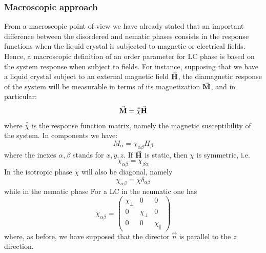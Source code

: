 \documentclass[../../Main/Main.tex]{subfiles}
\begin{document}
\subsubsection{Macroscopic approach}
From a macroscopic point of view we have already stated that an important difference between the disordered and nematic phases consists in the response functions when the liquid crystal is subjected to magnetic or electrical fields. Hence, a macroscopic definition of an order parameter for LC phase is based on the system response when subject to fields. For instance, supposing that we have a liquid crystal subject to an external magnetic field \( \va{H} \), the diamagnetic response of the system will be measurable in terms of its magnetization \( \va{M} \), and in particular:
\begin{equation}
  \va{M} = \bar{\bar{\chi } } \va{H}
\end{equation}
where  \(  \bar{\bar{\chi } } \) is the response function matrix, namely the magnetic susceptibility of the system. In components we have:
\begin{equation}
  M_ \alpha = \chi _{\alpha \beta } H _{\beta }
\end{equation}
where the inexes \( \alpha , \beta  \) stands for \( x,y,z \). If \( \va{H} \) is static, then \( \chi  \) is symmetric, i.e.
\begin{equation*}
  \chi _{\alpha \beta } = \chi _{\beta \alpha }
\end{equation*}
In the isotropic phase \( \chi  \) will also be diagonal, namely
\begin{equation*}
  \chi _{\alpha \beta } = \chi  \delta _{\alpha \beta }
\end{equation*}
while in the nematic phase
For a LC in the neumatic one has
\begin{equation}
  \chi _{\alpha \beta } =
  \begin{pmatrix}
  \chi _\bot   &  0 & 0 \\
    0 &  \chi _ \bot & 0 \\
    0 &  0 &  \chi _\parallel
  \end{pmatrix}
\end{equation}
where, as before, we have supposed that the director \( \overset{\leftrightarrow}{n} \) is parallel to the \( z \) direction.
\end{document}
